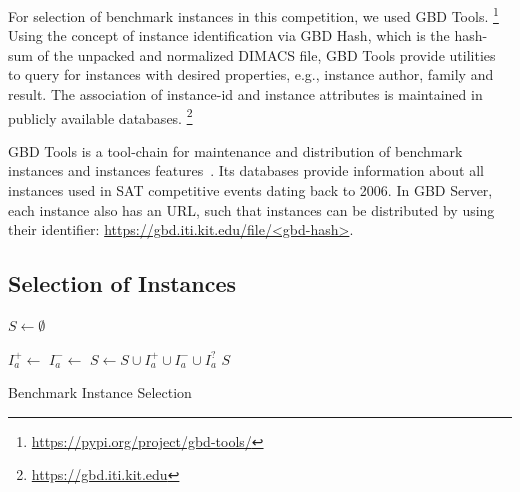 \documentclass{elsarticle}
\begin{document}
For selection of benchmark instances in this competition, we used GBD Tools.%
\footnote{\url{https://pypi.org/project/gbd-tools/}} 
Using the concept of instance identification via GBD Hash, which is the hash-sum of the unpacked and normalized DIMACS file, GBD Tools provide utilities to query for instances with desired properties, e.g., instance author, family and result.
The association of instance-id and instance attributes is maintained in publicly available databases.%
\footnote{\url{https://gbd.iti.kit.edu}}

GBD Tools is a tool-chain for maintenance and distribution of benchmark instances and instances features~\cite{Iser:2018:GBD}. 
Its databases provide information about all instances used in SAT competitive events dating back to 2006. 
In GBD Server, each instance also has an URL, such that instances can be distributed by using their identifier: \url{https://gbd.iti.kit.edu/file/<gbd-hash>}.


\subsection{Selection of Instances}
\label{sec:byob}

\begin{algorithm}[t]
\DontPrintSemicolon

\BlankLine
$S \leftarrow \emptyset$\;

 {
	$I_a^+ \leftarrow$ \;	
	$I_a^- \leftarrow$ \;	
	$S \leftarrow S \cup I_a^+ \cup I_a^- \cup I_a^?$\;	
}
\Return $S$\;

\caption{Benchmark Instance Selection}
\label{algo:select}
\end{algorithm}
\end{document}
